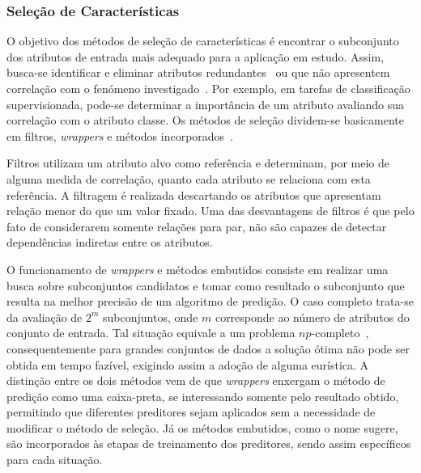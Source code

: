 

\subsubsection{Seleção de Características} 

O objetivo dos métodos de seleção de características é encontrar o subconjunto  dos atributos de entrada mais adequado para a aplicação em estudo. 
Assim, busca-se identificar e eliminar atributos redundantes~\cite{Kohavi1997} ou que não apresentem correlação com o fenómeno investigado~\cite{Nilsson2007}. 
Por exemplo, em tarefas de classificação supervisionada, pode-se determinar a importância de um atributo avaliando sua correlação com o atributo classe. Os métodos de seleção dividem-se basicamente em filtros, \emph{wrappers} e métodos incorporados~\cite{Guyon2003}. 

Filtros utilizam um atributo alvo como referência e determinam, por meio de alguma medida de correlação, quanto cada atributo se relaciona com esta referência. 
A filtragem é realizada descartando os atributos que apresentam relação menor do que um valor fixado.
Uma das desvantagens de filtros é que pelo fato de considerarem somente relações para par, não são capazes de detectar dependências indiretas entre os atributos. 

O funcionamento de \emph{wrappers} e métodos embutidos consiste em realizar uma busca sobre subconjuntos candidatos e tomar como resultado o subconjunto que resulta na melhor precisão de um algoritmo de predição.
O caso completo trata-se da avaliação de $2^m$ subconjuntos, onde $m$ corresponde ao número de atributos do conjunto de entrada. 
Tal situação equivale a um problema $np$-completo~\cite{Amaldi1998}, consequentemente para grandes conjuntos de dados a solução ótima não pode ser obtida em tempo fazível, exigindo assim a adoção de alguma eurística. 
A distinção entre os dois métodos vem de que \emph{wrappers} enxergam o método de predição como uma caixa-preta, se interessando somente pelo resultado obtido, permitindo que diferentes preditores sejam aplicados sem a necessidade de modificar o método de seleção. Já os métodos embutidos, como o nome sugere, são incorporados às etapas de treinamento dos preditores, sendo assim específicos para cada situação. 

